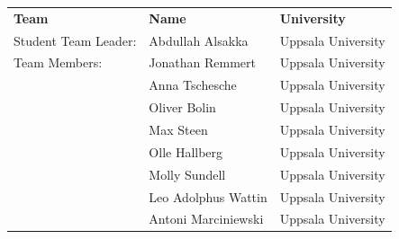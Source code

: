 \documentclass[ %
  a4paper, %
  11pt, %
  openany, %
  parskip, %
  toc=totoc, %
  listof=totoc, %
  bibliography=totoc %
]{scrreprt} %
\providecommand{\DIFaddbegin}{} %
\providecommand{\DIFaddend}{} %
\providecommand{\DIFdelbegin}{} %
\providecommand{\DIFdelend}{} %
\providecommand{\DIFscaledelfig}{0.5}
\newlength{\DIFdelgraphicswidth} %
\newlength{\DIFdelgraphicsheight} %
\providecommand{\DIFaddincludegraphics}[2][]{{\color{blue}\fbox{\DIFOincludegraphics[#1]{#2}}}} %
\providecommand{\DIFdelincludegraphics}[2][]{%
\sbox{\DIFdelgraphicsbox}{\DIFOincludegraphics[#1]{#2}}%
\settoboxwidth{\DIFdelgraphicswidth}{\DIFdelgraphicsbox} %
\settoboxtotalheight{\DIFdelgraphicsheight}{\DIFdelgraphicsbox} %
\scalebox{\DIFscaledelfig}{%
\parbox[b]{\DIFdelgraphicswidth}{\usebox{\DIFdelgraphicsbox}\\[-\baselineskip] \rule{\DIFdelgraphicswidth}{0em}}\llap{\resizebox{\DIFdelgraphicswidth}{\DIFdelgraphicsheight}{%
\setlength{\unitlength}{\DIFdelgraphicswidth}%
\begin{picture}(1,1)%
\thicklines\linethickness{2pt} %
{\color[rgb]{1,0,0}\put(0,0){\framebox(1,1){}}}%
{\color[rgb]{1,0,0}\put(0,0){\line( 1,1){1}}}%
{\color[rgb]{1,0,0}\put(0,1){\line(1,-1){1}}}%
\end{picture}%
}\hspace*{3pt}}} %
} %
\DeclareRobustCommand{\DIFaddbegin}{\DIFOaddbegin \let\includegraphics\DIFaddincludegraphics} %
\DeclareRobustCommand{\DIFaddend}{\DIFOaddend \let\includegraphics\DIFOincludegraphics} %
\DeclareRobustCommand{\DIFdelbegin}{\DIFOdelbegin \let\includegraphics\DIFdelincludegraphics} %
\DeclareRobustCommand{\DIFdelend}{\DIFOaddend \let\includegraphics\DIFOincludegraphics} %
\begin{document}
\begin{titlepage}
\DIFdelbegin %
\DIFdelend \DIFaddbegin \begin{tabular}{l l l}
  \textbf{Team}        & \textbf{Name} & \textbf{University}\\
  Student Team Leader: & Abdullah Alsakka & Uppsala University \\
  Team Members: & Jonathan Remmert & Uppsala University \\
    & Anna Tschesche & Uppsala University \\
    & Oliver Bolin & Uppsala University\\
    & Max Steen & Uppsala University \\
    & Olle Hallberg & Uppsala University \\
    & Molly Sundell & Uppsala University \\
    & Leo Adolphus Wattin & Uppsala University \\
    & Antoni Marciniewski & Uppsala University \\   
\end{tabular}
\DIFaddend 

\DIFdelbegin %
\DIFdelend \DIFaddbegin \enlargethispage{3cm}
\DIFaddend 


\end{titlepage}
\end{document}
